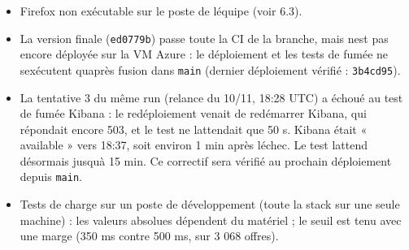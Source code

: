 \documentclass[
  11pt,
]{article}
\providecommand{\tightlist}{%
  \setlength{\itemsep}{0pt}\setlength{\parskip}{0pt}}
\begin{document}
\begin{itemize}
\tightlist
\item
  Firefox non exécutable sur le poste de l\textquotesingle équipe (voir
  6.3).
\item
  La version finale (\texttt{ed0779b}) passe toute la CI de la branche,
  mais n\textquotesingle est pas encore déployée sur la VM Azure : le
  déploiement et les tests de fumée ne s\textquotesingle exécutent
  qu\textquotesingle après fusion dans \texttt{main} (dernier
  déploiement vérifié : \texttt{3b4cd95}).
\item
  La tentative 3 du même run (relance du 10/11, 18:28 UTC) a échoué au
  test de fumée Kibana : le redéploiement venait de redémarrer Kibana,
  qui répondait encore 503, et le test ne l\textquotesingle attendait
  que 50 s. Kibana était « available » vers 18:37, soit environ 1 min
  après l\textquotesingle échec. Le test l\textquotesingle attend
  désormais jusqu\textquotesingle à 15 min. Ce correctif sera vérifié au
  prochain déploiement depuis \texttt{main}.
\item
  Tests de charge sur un poste de développement (toute la stack sur une
  seule machine) : les valeurs absolues dépendent du matériel ; le seuil
  est tenu avec une marge (350 ms contre 500 ms, sur 3 068 offres).
\end{itemize}
\end{document}
